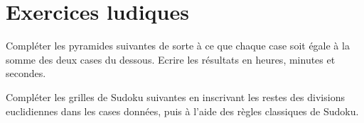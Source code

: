\section{Exercices ludiques}

 Compléter les pyramides suivantes de sorte à ce que chaque case soit égale à la somme des deux cases du dessous. Ecrire les résultats en heures, minutes et secondes.

\begin{minipage}[t]{0.45\textwidth}
	
\end{minipage}
\hfil
\vrule
\hfil
\begin{minipage}[t]{0.45\textwidth}
	
\end{minipage}

\newpage 

 Compléter les grilles de Sudoku suivantes en inscrivant les restes des divisions euclidiennes dans les cases données, puis à l'aide des règles classiques de Sudoku.
\vfil

\vfil


\newpage



\newpage

\newpage


